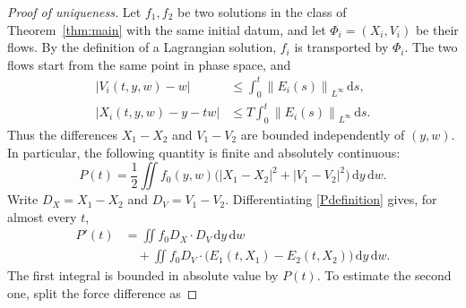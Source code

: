 \documentclass[11pt]{article}
\newcommand{\norm}[1]{\left\lVert #1\right\rVert}
\newcommand{\abs}[1]{\left\lvert #1\right\rvert}
\newcommand{\dd}{\,\mathrm d}
\begin{document}
\begin{proof}[Proof of uniqueness]
Let $f_1,f_2$ be two solutions in the class of Theorem~\ref{thm:main} with
the same initial datum, and let
$\Phi_i=(X_i,V_i)$ be their flows.
 By the definition of a Lagrangian solution, $f_i$ is
transported by $\Phi_i$.  The two flows start from the same point in phase
space, and
\begin{align*}
 |V_i(t,y,w)-w|
 &\leq\int_0^t\norm{E_i(s)}_{L^\infty}\dd s,\\
 |X_i(t,y,w)-y-tw|
 &\leq T\int_0^t\norm{E_i(s)}_{L^\infty}\dd s.
\end{align*}
Thus the differences $X_1-X_2$ and $V_1-V_2$ are bounded independently of
$(y,w)$.  In particular, the following quantity is finite and absolutely
continuous:
 \begin{equation}\label{Pdefinition}
 P(t)=\frac{1}{2}\iint f_0(y,w)
\big(\abs{X_1-X_2}^2+\abs{V_1-V_2}^2\big)\dd y\dd w.
\end{equation}
 Write $D_X=X_1-X_2$ and $D_V=V_1-V_2$.
Differentiating \eqref{Pdefinition} gives, for almost every $t$,
\begin{align*}
 P'(t)
 &=\iint f_0D_X\cdot D_V\dd y\dd w\\
 &\quad+\iint f_0D_V\cdot
 \bigl(E_1(t,X_1)-E_2(t,X_2)\bigr)\dd y\dd w.
\end{align*}
The first integral is bounded in absolute value by $P(t)$.  To
estimate the second one, split the force difference as


\end{proof}
\end{document}

